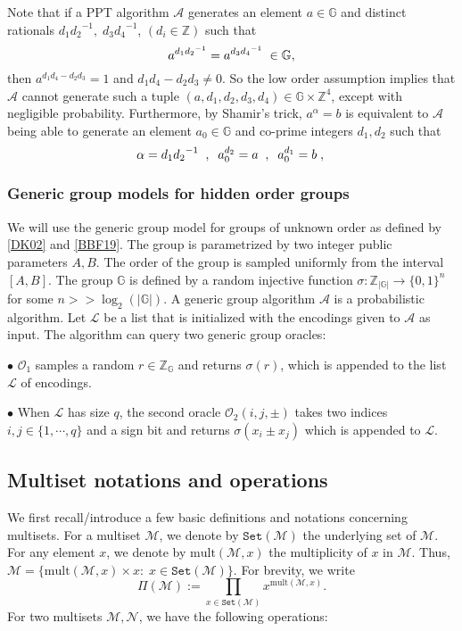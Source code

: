 \documentclass[11pt, lettersize, notitlepage, leqno, footskip=0.6cm]{article}
\newcommand{\bz}{\mathbb Z}
\newcommand{\pl}{\prod\limits}
\newcommand{\ttt}{\texttt}
\newcommand{\bG}{\mathbb{G}}
\newcommand{\sett}{\ttt{Set}}
\newcommand{\mult}{\mr{mult}}
\newcommand{\mul}{\mr{mult}}
\newcommand{\lra}{\longrightarrow}
\newcommand{\mc}{\mathcal}
\newcommand{\mb}{\mathbb}
\newcommand{\mr}{\mathrm}
\newcommand{\al}{\alpha}
\newcommand{\A}{\mc{A}}
\newcommand{\vs}{\vspace{-0.15cm}}
\newcommand{\noin}{\noindent}
\numberwithin{equation}{section}
\begin{document}
\noin Note that if a PPT algorithm $\A$ generates an element $a\in\mb{G}$ and distinct rationals ${d_1}{d_2}^{-1},\; {d_3}{d_4}^{-1}$, $(d_i\in\bz)$ such that \vs $$a^{{d_1}{d_2}^{-1}} = a^{{d_3}{d_4}^{-1}}\;\in\bG, \vs $$ then $a^{d_1d_4-d_2d_3} = 1$ and $d_1d_4-d_2d_3\neq 0$. So the low order assumption implies that $\A$ cannot generate such a tuple $(a,d_1,d_2,d_3,d_4)\in \bG\times \bz^4$, except with negligible probability. Furthermore, by Shamir's trick, $a^{\al} = b$ is equivalent to $\A$ being able to generate an element $a_0\in\mb{G}$ and co-prime integers $d_1,d_2$ such that \vs $$\al = {d_1}{d_2}^{-1}\;\;,\;\;a_0^{d_2} =a\;\;,\;\; a_0^{d_1} =b\;,\; \vs $$

\subsubsection{\fontsize{11}{11}\selectfont Generic group models for hidden order groups}

We will use the generic group model for groups of unknown order as defined by \hyperlink{DK02}{[DK02]} and \hyperlink{BBF19}{[BBF19]}. The group is parametrized by two integer public parameters $A, B$. The order of the group is sampled uniformly from  the interval $[A, B]$. The group $\bG$ is defined by a random injective function $\sigma: \bz_{|\bG|}\lra \{0, 1 \}^n$ for some $n>>\log_2(|\bG|)$. A generic group algorithm $\mc{A}$ is a probabilistic algorithm. Let $\mc{L}$ be a list that is initialized with the encodings given to $\A$ as input. The algorithm can query two generic group oracles: \vspace{0.1cm}

\noin $\bullet$ \hypertarget{Oracles}{$\mc{O}_1$} samples a random $r\in \bz_{\bG}$ and returns $\sigma(r)$, which is appended to the list $\mc{L}$ of encodings.

\noin $\bullet$ When $\mc{L}$ has size $q$, the second oracle $\mc{O}_2(i,j,\pm)$ takes two indices $i, j\in\{1,\cdots,q \}$ and a sign bit and returns $\sigma(x_i\pm x_j)$ which is appended to $\mc{L}$.


\subsection{\fontsize{11}{11}\selectfont Multiset notations and operations}


We first recall/introduce a few basic definitions and notations concerning multisets. For a multiset $\mc{M}$, we denote by $\sett(\mc{M})$ the underlying set of $\mc{M}$. For any element $x$, we denote by $\mul(\mc{M},x)$ the multiplicity of $x$ in $\mc{M}$. Thus, $\mc{M} = \{ \mult(\mc{M},x)\times x: \; x\in \sett(\mc{M})\}$. For brevity, we write \vs $$\Pi(\mc{M}):= \pl_{x\in \sett(\mc{M})} x^{\mult(\mc{M},x)}.$$ For two multisets $\mc{M}, \mc{N}$, we have the following operations:\vspace{0.1cm}
\end{document}
